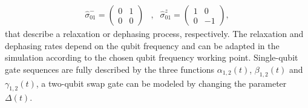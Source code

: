 %
\begin{align}
\hat{\sigma}_{01}^-  =  \left( \begin{array}{cc} 0 & 1 \\ 0 & 0 \end{array} \right) &, & \hat{\sigma}_{01}^z  =  \left( \begin{array}{cc} 1 & 0 \\ 0 & -1 \end{array}\right),
\end{align}
%
that describe a relaxation or dephasing process, respectively. The relaxation and dephasing rates depend on the qubit frequency and can be adapted in the simulation according to the chosen qubit frequency working point. Single-qubit gate sequences are fully described by the three functions $\alpha_{1,2}(t)$, $\beta_{1,2}(t)$ and $\gamma_{1,2}(t)$, a two-qubit swap gate can be modeled by changing the parameter $\Delta(t)$.
